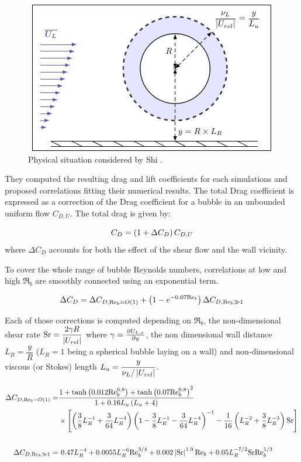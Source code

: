 \begin{figure}[h!]
\centering
\includegraphics[width=0.55\linewidth]{img/bub_dyn/shi_scheme.pdf}
\caption{Physical situation considered by Shi \etal \cite{shi_drag_2021}.}
\label{fig:shi_scheme}
\end{figure}


They computed the resulting drag and lift coefficients for each simulations and proposed correlations fitting their numerical results. The total Drag coefficient is expressed as a correction of the Drag coefficient for a bubble in an unbounded uniform flow  $C_{D,U}$. The total drag is given by:

\begin{equation}
C_{D}=\left( 1+\Delta C_{D} \right)C_{D,U}
\end{equation}
where $\Delta C_{D}$ accounts for both the effect of the shear flow and the wall vicinity. 

\npar
To cover the whole range of bubble Reynolds numbers, correlations at low and high $\Re_{b}$ are smoothly connected using an exponential term.

\begin{equation}
\Delta C_{D}=\Delta C_{D,\mathrm{Re}_{b}=O\left( 1 \right)}+\left( 1-e^{-0.07\mathrm{Re}_{b}} \right)\Delta C_{D,{\mathrm{Re}_{b}\gg 1}}
\label{eq:drag_corr_shi}
\end{equation}


Each of those corrections is computed depending on $\Re_{b}$,  the non-dimensional shear rate $\mathrm{Sr} = \dfrac{2 \gamma R}{\left| U_{rel} \right| }$ where $\gamma = \frac{\partial U_{L,x}}{\partial y}$, the non dimensional wall distance $L_{R} = \dfrac{y}{R}$   ($L_{R}=1$ being a spherical bubble laying on a wall) and non-dimensional viscous (or Stokes) length $L_{u}=\dfrac{y}{\nu_{L}/\left| U_{rel} \right|}$. 


\begin{align}
\nonumber \Delta C_{D,\Re_{b}=O\parth{1}} = & \frac{1+\mathrm{tanh}\parth{0.012\Re_{b}^{0.8}} + \mathrm{tanh}\parth{0.07\Re_{b}^{0.8}}^{2}}{1+0.16L_{u}\parth{L_{u}+4}}\\
& \times \left[ \left(\frac{3}{8}L_{R}^{-1} + \frac{3}{64}L_{R}^{-4}\right) \left(1- \frac{3}{8}L_{R}^{-1}-\frac{3}{64}L_{R}^{-4}\right)^{-1} - \frac{1}{16}\left(L_{R}^{-2}+\frac{3}{8}L_{R}^{-3}\right)\text{Sr} \right] \\
%
\nonumber\\
\Delta C_{D,{\Re_{b}\gg 1}} =& ~0.47L_{R}^{-4}+0.0055L_{R}^{-6}\Re_{b}^{3/4} 
+0.002 \bars{\mathrm{Sr}}^{1.9} \Re_{b} + 0.05 L_{R}^{-7/2} \mathrm{Sr} \Re_{b}^{1/3}
\end{align}



